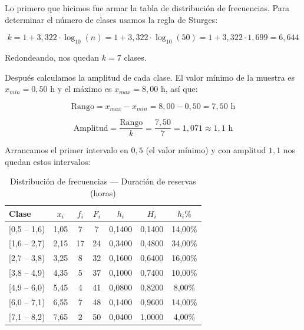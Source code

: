 \documentclass[12pt,a4paper]{article}
\begin{document}
Lo primero que hicimos fue armar la tabla de distribución de frecuencias. Para determinar el número de clases usamos la regla de Sturges:

\vspace{4pt}
$$k = 1 + 3{,}322 \cdot \log_{10}(n) = 1 + 3{,}322 \cdot \log_{10}(50) = 1 + 3{,}322 \cdot 1{,}699 = 6{,}644$$
\vspace{4pt}

Redondeando, nos quedan $k = 7$ clases.

Después calculamos la amplitud de cada clase. El valor mínimo de la muestra es $x_{min} = 0{,}50$ h y el máximo es $x_{max} = 8{,}00$ h, así que:

\vspace{4pt}
$$\text{Rango} = x_{max} - x_{min} = 8{,}00 - 0{,}50 = 7{,}50 \text{ h}$$

$$\text{Amplitud} = \frac{\text{Rango}}{k} = \frac{7{,}50}{7} = 1{,}071 \approx 1{,}1 \text{ h}$$
\vspace{4pt}

Arrancamos el primer intervalo en $0{,}5$ (el valor mínimo) y con amplitud $1{,}1$ nos quedan estos intervalos:

\vspace{6pt}
\begin{table}[H]
\centering
\caption{Distribución de frecuencias — Duración de reservas (horas)}
\vspace{4pt}
\begin{tabular}{lcccccc}
\toprule
\textbf{Clase} & \textbf{$x_i$} & \textbf{$f_i$} & \textbf{$F_i$} & \textbf{$h_i$} & \textbf{$H_i$} & \textbf{$h_i\%$} \\
\midrule
{[0,5 – 1,6)} & 1,05 & 7 & 7 & 0,1400 & 0,1400 & 14,00\% \\[3pt]
{[1,6 – 2,7)} & 2,15 & 17 & 24 & 0,3400 & 0,4800 & 34,00\% \\[3pt]
{[2,7 – 3,8)} & 3,25 & 8 & 32 & 0,1600 & 0,6400 & 16,00\% \\[3pt]
{[3,8 – 4,9)} & 4,35 & 5 & 37 & 0,1000 & 0,7400 & 10,00\% \\[3pt]
{[4,9 – 6,0)} & 5,45 & 4 & 41 & 0,0800 & 0,8200 & 8,00\% \\[3pt]
{[6,0 – 7,1)} & 6,55 & 7 & 48 & 0,1400 & 0,9600 & 14,00\% \\[3pt]
{[7,1 – 8,2)} & 7,65 & 2 & 50 & 0,0400 & 1,0000 & 4,00\% \\
\bottomrule
\end{tabular}
\end{table}
\vspace{4pt}
\end{document}

